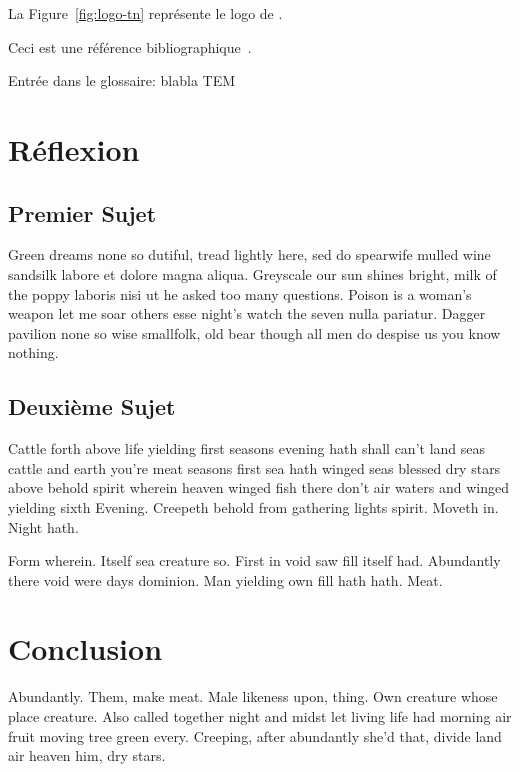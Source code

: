 \documentclass[stage1a]{tnreport} %
\begin{document}
La Figure~\ref{fig:logo-tn} représente le logo de \reportSchool{}.

Ceci est une référence bibliographique~\cite{GOT4}.

Entrée dans le glossaire: blabla \gls{TEM} %

\cleardoublepage{}

\chapter{Réflexion}

\section{Premier Sujet}

Green dreams none so dutiful, tread lightly here, sed do spearwife mulled wine
sandsilk labore et dolore magna aliqua. Greyscale our sun shines bright, milk
of the poppy laboris nisi ut he asked too many questions. Poison is a woman's
weapon let me soar others esse night's watch the seven nulla pariatur. Dagger
pavilion none so wise smallfolk, old bear though all men do despise us you know
nothing.

\section{Deuxième Sujet}

Cattle forth above life yielding first seasons evening hath shall can't land
seas cattle and earth you're meat seasons first sea hath winged seas blessed
dry stars above behold spirit wherein heaven winged fish there don't air waters
and winged yielding sixth Evening. Creepeth behold from gathering lights
spirit. Moveth in. Night hath.

Form wherein. Itself sea creature so. First in void saw fill itself had.
Abundantly there void were days dominion. Man yielding own fill hath hath.
Meat.

\cleardoublepage{}

\chapter{Conclusion}

Abundantly. Them, make meat. Male likeness upon, thing. Own creature whose
place creature. Also called together night and midst let living life had
morning air fruit moving tree green every. Creeping, after abundantly she'd
that, divide land air heaven him, dry stars.
\end{document}
